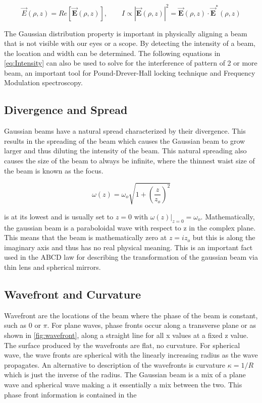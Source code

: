 \documentclass[11pt,a4paper]{book}
\begin{document}
			\begin{equation} 
				\vec{E}(\rho,z)=Re[\vec{\textbf{E}}(\rho,z)], \qquad
				\textit{I} \propto |\vec{\textbf{E}}(\rho,z)|^2=\vec{\textbf{E}}(\rho,z)\cdot \vec{\textbf{E}}^*(\rho,z)
				\label{eq:Intensity}
			\end{equation}
			
			The Gaussian distribution property is important in physically aligning a beam that is not visible with our eyes or a scope. By detecting the intensity of a beam, the location and width can be determined. The following equations in \autoref{eq:Intensity} can also be used to solve for the interference of pattern of 2 or more beam, an important tool for Pound-Drever-Hall locking technique and Frequency Modulation spectroscopy.
			
		\subsection{Divergence and Spread}
			\label{subsec:Divergence}
			Gaussian beams have a natural spread characterized by their divergence.
			This results in the spreading of the beam which causes the Gaussian beam to grow larger and thus diluting the intensity of the beam.
			This natural spreading also causes the size of the beam to always be infinite, where the thinnest waist size of the beam is known as the focus. 
			
			\begin{equation}
				\omega (z)=\omega_o \sqrt{1+\left(\dfrac{z}{z_o}\right)^2}
			\end{equation}
			
			is at its lowest and is usually set to $z=0$ with $\omega(z)|_{z=0}=\omega_o$.
			Mathematically, the gaussian beam is a paraboloidal wave with respect to z in the complex plane. 
			This means that the beam is mathematically zero at $z=i z_o$ but this is along the imaginary axis and thus has no real physical meaning. 
			This is an important fact used in the ABCD law for describing the transformation of the gaussian beam via thin lens and spherical mirrors.
			
		\subsection{Wavefront and Curvature}
			\label{subsec:Wavefront and Curvature}
			Wavefront are the locations of the beam where the phase of the beam is constant, such as 0 or $\pi$. For plane waves, phase fronts occur along a transverse plane or as shown in \autoref{fig:wavefront}, along a straight line for all x values at a fixed z value. The surface produced by the wavefronts are flat, no curvature. For spherical wave, the wave fronts are spherical with the linearly increasing radius as the wave propagates. An alternative to description of the wavefronts is curvature $\kappa = 1/R$ which is just the inverse of the radius.
			The Gaussian beam is a mix of a plane wave and spherical wave making a it essentially a mix between the two. This phase front information is contained in the 
							
\end{document}
